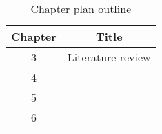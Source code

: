 \begin{table}[h!]
\centering
\begin{tabular}{cc}
{Chapter} & {Title} \\ \midrule
{3} & {Literature review} \\
{4} & {} \\
{5} & {} \\
{6} & {}
\end{tabular}
\caption{Chapter plan outline}
\label{table:1}
\end{table}